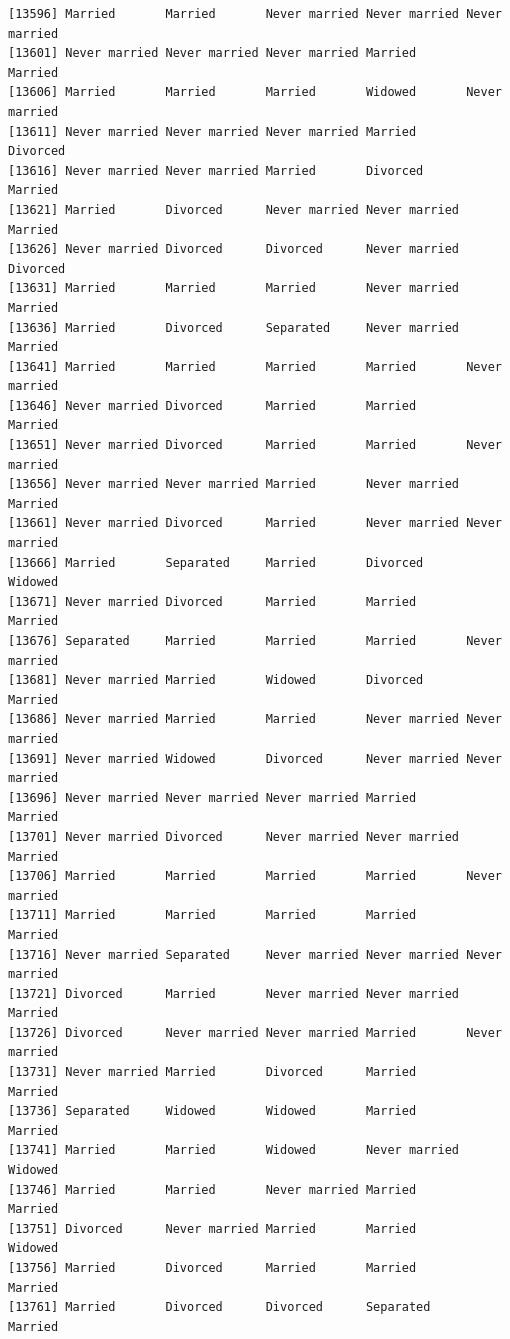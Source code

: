 \documentclass[
  letterpaper,
  DIV=11,
  numbers=noendperiod,
  oneside]{scrartcl}
\begin{document}
\begin{verbatim}
[13596] Married       Married       Never married Never married Never married
[13601] Never married Never married Never married Married       Married      
[13606] Married       Married       Married       Widowed       Never married
[13611] Never married Never married Never married Married       Divorced     
[13616] Never married Never married Married       Divorced      Married      
[13621] Married       Divorced      Never married Never married Married      
[13626] Never married Divorced      Divorced      Never married Divorced     
[13631] Married       Married       Married       Never married Married      
[13636] Married       Divorced      Separated     Never married Married      
[13641] Married       Married       Married       Married       Never married
[13646] Never married Divorced      Married       Married       Married      
[13651] Never married Divorced      Married       Married       Never married
[13656] Never married Never married Married       Never married Married      
[13661] Never married Divorced      Married       Never married Never married
[13666] Married       Separated     Married       Divorced      Widowed      
[13671] Never married Divorced      Married       Married       Married      
[13676] Separated     Married       Married       Married       Never married
[13681] Never married Married       Widowed       Divorced      Married      
[13686] Never married Married       Married       Never married Never married
[13691] Never married Widowed       Divorced      Never married Never married
[13696] Never married Never married Never married Married       Married      
[13701] Never married Divorced      Never married Never married Married      
[13706] Married       Married       Married       Married       Never married
[13711] Married       Married       Married       Married       Married      
[13716] Never married Separated     Never married Never married Never married
[13721] Divorced      Married       Never married Never married Married      
[13726] Divorced      Never married Never married Married       Never married
[13731] Never married Married       Divorced      Married       Married      
[13736] Separated     Widowed       Widowed       Married       Married      
[13741] Married       Married       Widowed       Never married Widowed      
[13746] Married       Married       Never married Married       Married      
[13751] Divorced      Never married Married       Married       Widowed      
[13756] Married       Divorced      Married       Married       Married      
[13761] Married       Divorced      Divorced      Separated     Married      

\end{verbatim}
\end{document}
